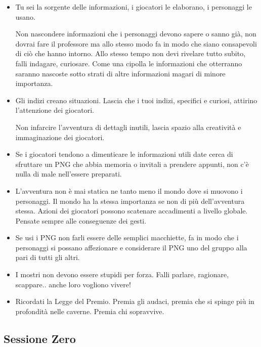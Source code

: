 \begin{multicols}{2}
\begin{itemize}[leftmargin=*]
\item
Tu sei la sorgente delle informazioni, i giocatori le elaborano, i personaggi le usano.

Non nascondere informazioni che i personaggi devono sapere o sanno già, non dovrai fare il professore ma allo stesso modo fa in modo che siano consapevoli di ciò che hanno intorno.
Allo stesso tempo non devi rivelare tutto subito, falli indagare, curiosare. Come una cipolla le informazioni che otterranno saranno nascoste sotto strati di altre informazioni magari di minore importanza.

\item
Gli indizi creano situazioni. Lascia che i tuoi indizi, specifici e curiosi, attirino l'attenzione dei giocatori.%

Non infarcire l'avventura di dettagli inutili, lascia spazio alla creatività e immaginazione dei giocatori. %

\item
Se i giocatori tendono a dimenticare le informazioni utili date cerca di sfruttare un PNG che abbia memoria o invitali a prendere appunti, non c'è nulla di male nell'essere preparati.

\item
L'avventura non è mai statica ne tanto meno il mondo dove si muovono i personaggi.
Il mondo ha la stessa importanza se non di più dell'avventura stessa. Azioni dei giocatori possono scatenare accadimenti a livello globale. Pensate sempre alle conseguenze dei gesti.

\item
Se usi i PNG non farli essere delle semplici macchiette, fa in modo che i personaggi si possano affezionare e considerare il PNG uno del gruppo alla pari di tutti gli altri.

\item
I mostri non devono essere stupidi per forza. Falli parlare, ragionare, scappare.. anche loro vogliono vivere!

\item
Ricordati la Legge del Premio. Premia gli audaci, premia che si spinge più in profondità nelle caverne. Premia chi sopravvive.

\end{itemize}

\subsection{Sessione Zero}\label{sessionezero}\hypertarget{sessionezero}{}


\end{multicols}
